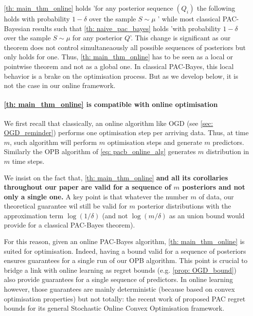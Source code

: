 \cref{th: main_thm_online} holds 'for any posterior sequence $(Q_i)$ the following holds with probability $1-\delta$ over the sample $S\sim\mu$ ' while most classical PAC-Bayesian results such that \cref{th: naive_pac_bayes} holds 'with probability $1-\delta$ over the sample $S\sim\mu$ for any posterior $Q$'. This change is significant as our theorem does not control simultaneaously all possible sequences of posteriors but only holds for one.
Thus, \cref{th: main_thm_online} has to be seen as a local or pointwise theorem and not as a global one. In classical PAC-Bayes, this local behavior is a brake on the optimisation process. But as we develop below, it is not the case in our online framework.

\paragraph{\cref{th: main_thm_online} is compatible with online optimisation}

We first recall that classically, an online algorithm like OGD (see \cref{sec: OGD_reminder}) performs one optimisation step per arriving data. Thus, at time $m$, such algorithm will perform $m$ optimisation steps and generate $m$ predictors. Similarly the OPB algorithm of \cref{eq: pacb_online_alg} generates $m$ distribution in $m$ time steps.

We insist on the fact that, \cref{th: main_thm_online} \textbf{and all its corollaries throughout our paper are valid for a sequence of $m$ posteriors and not only a single one.} A key point is that whatever the number $m$ of data, our theoretical guarantee wil still be valid for $m$ posterior distributions with the approximation term $\log(1/\delta)$ (and not $\log(m/\delta)$ as an union bound would provide for a classical PAC-Bayes theorem).

For this reason, given an online PAC-Bayes algorithm, \cref{th: main_thm_online} is suited for optimisation. Indeed, having a bound valid for a sequence of posteriors ensures guarantees for a single run of our OPB algorithm. This point is crucial to bridge a link with online learning as regret bounds (e.g. \cref{prop: OGD_bound}) also provide guarantees for a single sequence of predictors. In online learning however, those guarantees are mainly deterministic (because based on convex optimisation properties) but not totally: the recent work of \cite{wintenberger2021stochastic} proposed PAC regret bounds for its general Stochastic Online Convex Optimisation framework.

